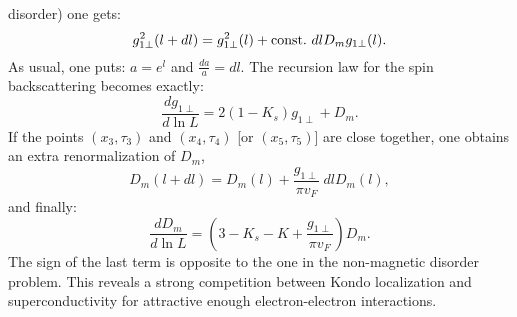disorder) one gets:
\begin{equation}
g_{1\perp}^2(l+dl)=g_{1\perp}^2(l)+\hbox{const}.\ dlD_mg_{1\perp}(l).
\end{equation}
As usual, one puts: $a=e^l$ and $\frac{da}{a}=dl$. The recursion law
for the spin backscattering becomes exactly:
\begin{equation}
\frac{dg_{1\perp}}{d\ln L} = 2(1-K_s)g_{1\perp}+D_m.
\end{equation}
\vskip 0.1cm
If the points $(x_3,\tau_3)$ and $(x_4,\tau_4)$ [or $(x_5,\tau_5)$] are
close together, one obtains an extra renormalization of $D_m$,
\begin{equation}
D_m(l+dl)=D_m(l)+\frac{g_{1\perp}}{\pi v_F}\ dl D_m(l),
\end{equation}
and finally:
\begin{equation}
\frac{dD_m}{d\ln L} = (3-K_s-K+\frac{g_{1\perp}}{\pi v_F})D_m.
\end{equation}
The sign of the last term is opposite to the one in the non-magnetic
disorder problem. This reveals a strong competition between Kondo localization
and superconductivity for attractive enough electron-electron interactions.



